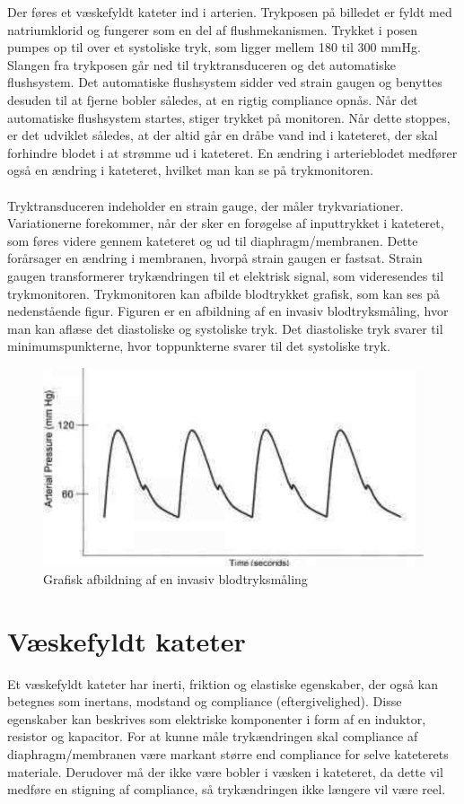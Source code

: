 Der føres et væskefyldt kateter ind i arterien. Trykposen på billedet er fyldt med natriumklorid og fungerer som en del af flushmekanismen. Trykket i posen pumpes op til over et systoliske tryk, som ligger mellem 180 til 300 mmHg. Slangen fra trykposen går ned til tryktransduceren og det automatiske flushsystem. Det automatiske flushsystem sidder ved strain gaugen og benyttes desuden til at fjerne bobler således, at en rigtig compliance opnås.  Når det automatiske flushsystem startes, stiger trykket på monitoren. Når dette stoppes, er det udviklet således, at der altid går en dråbe vand ind i kateteret, der skal forhindre blodet i at strømme ud i kateteret. En ændring i arterieblodet medfører også en ændring i kateteret, hvilket man kan se på trykmonitoren. \\\\
Tryktransduceren indeholder en strain gauge, der måler trykvariationer. Variationerne forekommer, når der sker en forøgelse af inputtrykket i kateteret, som føres videre gennem kateteret og ud til diaphragm/membranen. Dette forårsager en ændring i membranen, hvorpå strain gaugen er fastsat. Strain gaugen transformerer trykændringen til et elektrisk signal, som videresendes til trykmonitoren. Trykmonitoren kan afbilde blodtrykket grafisk, som kan ses på nedenstående figur. Figuren er en afbildning af en invasiv blodtryksmåling, hvor man kan aflæse det diastoliske og systoliske tryk. Det diastoliske tryk svarer til minimumspunkterne, hvor toppunkterne svarer til det systoliske tryk. 

\begin{figure}[H]
	\centering
	\includegraphics[width=1\textwidth]{Figurer/Snip20151207_51}
	\caption{Grafisk afbildning af en invasiv blodtryksmåling}
\end{figure}

\section{Væskefyldt kateter}
Et væskefyldt kateter har inerti, friktion og elastiske egenskaber, der også kan betegnes som inertans, modstand og compliance (eftergivelighed). Disse egenskaber kan beskrives som elektriske komponenter i form af en induktor, resistor og kapacitor. For at kunne måle trykændringen skal compliance af diaphragm/membranen være markant større end compliance for selve kateterets materiale. Derudover må der ikke være bobler i væsken i kateteret, da dette vil medføre en stigning af compliance, så trykændringen ikke længere vil være reel. 

